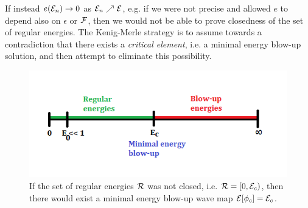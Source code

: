 \begin{remark}
	If instead $e(\mathcal E_n) \to 0$ as $\mathcal E_n \nearrow \mathcal E$, e.g. if we were not precise and allowed $e$ to depend also on $\epsilon$ or $\mathcal F$, then we would not be able to prove closedness of the set of regular energies. The Kenig-Merle strategy is to assume towards a contradiction that there exists a \emph{critical element}, i.e. a minimal energy blow-up solution, and then attempt to eliminate this possibility. 
	
	\begin{figure}[h]
		\begin{center}
			\includegraphics{graphics/kenigmerle}
			\caption{If the set of regular energies $\mathcal R$ was not closed, i.e. $\mathcal R = [0, \mathcal E_c)$, then there would exist a minimal energy blow-up wave map $\mathcal E [\phi_c] = \mathcal E_c$. }
		\end{center}
	\end{figure}
\end{remark}

